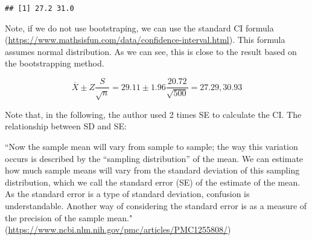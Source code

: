 \documentclass[]{book}
\begin{document}
\begin{verbatim}
## [1] 27.2 31.0
\end{verbatim}

Note, if we do not use bootstraping, we can use the standard CI formula (\url{https://www.mathsisfun.com/data/confidence-interval.html}). This formula assumes normal distribution. As we can see, this is close to the result based on the bootstrapping method.

\[\overline{X} \pm Z \frac{S}{\sqrt{n}}=29.11 \pm 1.96 \frac{20.72}{\sqrt{500}}=27.29, 30.93\]

Note that, in the following, the author used 2 times SE to calculate the CI. The relationship between SD and SE:

``Now the sample mean will vary from sample to sample; the way this variation occurs is described by the ``sampling distribution'' of the mean. We can estimate how much sample means will vary from the standard deviation of this sampling distribution, which we call the standard error (SE) of the estimate of the mean. As the standard error is a type of standard deviation, confusion is understandable. Another way of considering the standard error is as a measure of the precision of the sample mean." (\url{https://www.ncbi.nlm.nih.gov/pmc/articles/PMC1255808/})
\end{document}
